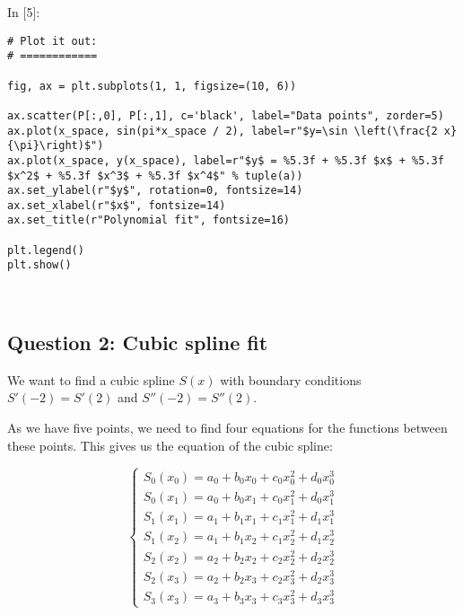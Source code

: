 \documentclass[11pt]{article}
\newif\ifcode
\newif\ifleftmargins
\newlength{\promptlength}
\newcommand{\prompt}[3]{
        \needspace{1.1cm}
        \settowidth{\promptlength}{ #1 [#3] }
        \ifleftmargins\hspace{-\promptlength}\hspace{-5pt}\fi
        {\color{#2}#1 [#3]:}
        \ifleftmargins\vspace{-2.7ex}\fi
    }
\begin{document}
    
\prompt{In}{incolor}{5}
\codetrue
\begin{tcolorbox}[breakable, size=fbox, boxrule=1pt, pad at break*=1mm, colback=cellbackground, colframe=cellborder]
\begin{verbatim}
# Plot it out: 
# ============

fig, ax = plt.subplots(1, 1, figsize=(10, 6))

ax.scatter(P[:,0], P[:,1], c='black', label="Data points", zorder=5)
ax.plot(x_space, sin(pi*x_space / 2), label=r"$y=\sin \left(\frac{2 x}{\pi}\right)$")
ax.plot(x_space, y(x_space), label=r"$y$ = %5.3f + %5.3f $x$ + %5.3f $x^2$ + %5.3f $x^3$ + %5.3f $x^4$" % tuple(a))
ax.set_ylabel(r"$y$", rotation=0, fontsize=14)
ax.set_xlabel(r"$x$", fontsize=14)
ax.set_title(r"Polynomial fit", fontsize=16)

plt.legend()
plt.show()
\end{verbatim}
\end{tcolorbox}
\codefalse

    \begin{center}
    \end{center}
    { \hspace*{\fill} \\}
    
    \hypertarget{question-2-cubic-spline-fit}{%
\subsection{Question 2: Cubic spline
fit}\label{question-2-cubic-spline-fit}}

    We want to find a cubic spline \(S(x)\) with boundary conditions
\(S'(-2)=S'(2)\) and \(S''(-2)=S''(2)\).

As we have five points, we need to find four equations for the functions
between these points. This gives us the equation of the cubic spline:

\[\left\{ \begin{array}{ll}
            S_0(x_0) = a_0 + b_0 x_0 + c_0 x_0^2 + d_0 x_0^3 \\
            S_0(x_1) = a_0 + b_0 x_1 + c_0 x_1^2 + d_0 x_1^3 \\
            S_1(x_1) = a_1 + b_1 x_1 + c_1 x_1^2 + d_1 x_1^3 \\
            S_1(x_2) = a_1 + b_1 x_2 + c_1 x_2^2 + d_1 x_2^3 \\
            S_2(x_2) = a_2 + b_2 x_2 + c_2 x_2^2 + d_2 x_2^3 \\
            S_2(x_3) = a_2 + b_2 x_3 + c_2 x_3^2 + d_2 x_3^3 \\
            S_3(x_3) = a_3 + b_3 x_3 + c_3 x_3^2 + d_3 x_3^3
            \end{array} \right.\]
\end{document}
